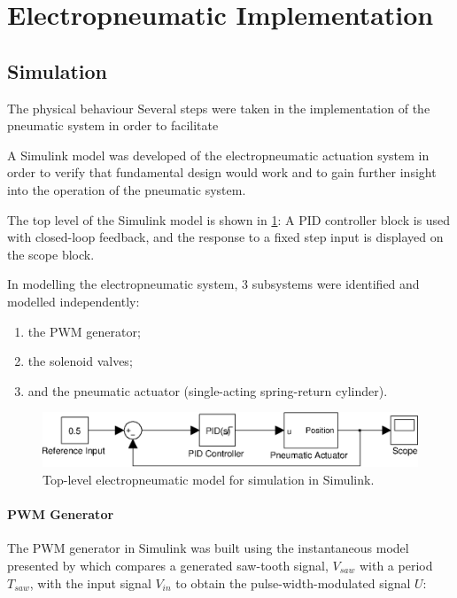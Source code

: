 \section{Electropneumatic Implementation}

\subsection{Simulation}

The physical behaviour 
Several steps were taken in the implementation of the pneumatic system in order to facilitate

A Simulink model was developed of the electropneumatic actuation system in order to verify that fundamental design would work and to gain further insight into the operation of the pneumatic system.

The top level of the Simulink model is shown in \ref{fig:pneumatics_top_level}: A PID controller block is used with closed-loop feedback, and the response to a fixed step input is displayed on the scope block.

In modelling the electropneumatic system, 3 subsystems were identified and modelled independently:

\begin{enumerate}
  \item the PWM generator;
  \item the solenoid valves;
  \item and the pneumatic actuator (single-acting spring-return cylinder).
\end{enumerate}

\begin{figure}[h]
\centering
\includegraphics[scale=1]{implementation/figures/pneumatic_modelling1.eps}
\caption{Top-level electropneumatic model for simulation in Simulink.}
\label{fig:pneumatics_top_level}
\end{figure}

\paragraph{PWM Generator}

The PWM generator in Simulink was built using the instantaneous model presented by \citet{valve_models} which compares a generated saw-tooth signal, $V_{saw}$ with a period $T_{saw}$, with the input signal $V_{in}$ to obtain the pulse-width-modulated signal $U$:

